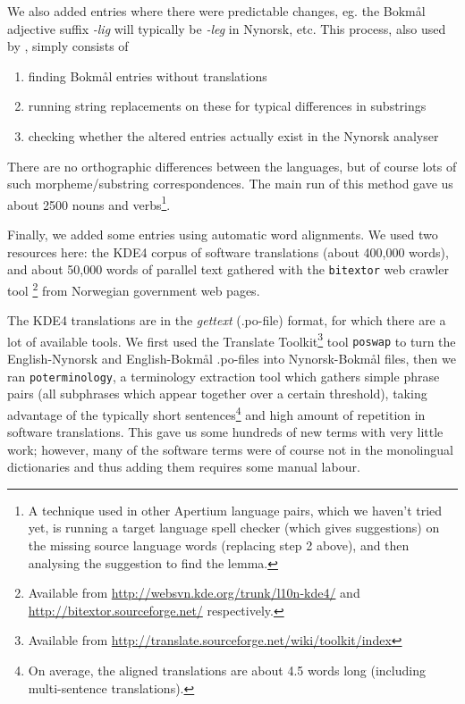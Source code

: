 \documentclass[11pt]{article}
\begin{document}
We also added entries where there were predictable changes, eg. the
Bokmål adjective suffix \emph{-lig} will typically be \emph{-leg} in Nynorsk,
etc. This process, also used by \citet[p.~4]{tyers2009dpm},
simply consists of
\begin{enumerate}
\item finding Bokmål entries without translations \item running string replacements on these for typical differences in
   substrings
\item checking whether the altered entries actually exist in the Nynorsk
   analyser
\end{enumerate}
There are no orthographic differences between the languages, but of
course lots of such morpheme/substring correspondences. The main run
of this method gave us about 2500 nouns and verbs\footnote{A technique
  used in other Apertium language pairs, which we haven't tried yet,
  is running a target language spell checker (which gives suggestions)
  on the missing source language words (replacing step 2 above), and
  then analysing the suggestion to find the lemma. }.

Finally, we added some entries using automatic word alignments. We
used two resources here: the KDE4 corpus of software translations
(about 400,000 words), and about 50,000 words of parallel text
gathered with the {\tt bitextor} web crawler tool
\citep{espla-gomis2009bfs}\footnote{Available
  from
  \href{http://websvn.kde.org/trunk/l10n-kde4/}{http://websvn.kde.org/trunk/l10n-kde4/}
  and
  \href{http://bitextor.sourceforge.net/}{http://bitextor.sourceforge.net/}
  respectively.} from Norwegian government web pages.

The KDE4 translations are in the \emph{gettext} (.po-file) format, for
which there are a lot of available tools. We first used the Translate
Toolkit\footnote{Available from
  \href{http://translate.sourceforge.net/wiki/toolkit/index}{http://translate.sourceforge.net/wiki/toolkit/index}
} tool {\tt poswap} to turn the English-Nynorsk and English-Bokmål
.po-files into Nynorsk-Bokmål files, then we ran
{\tt poterminology}, a terminology extraction tool which gathers
simple phrase pairs (all subphrases which appear together over a
certain threshold), taking advantage of the typically short
sentences\footnote{On average, the aligned translations are about 4.5
  words long (including multi-sentence translations).} and high amount
of repetition in software translations. This gave us some hundreds of
new terms with very little work; however, many of the software terms
were of course not in the monolingual dictionaries and thus adding
them requires some manual labour.
\end{document}
